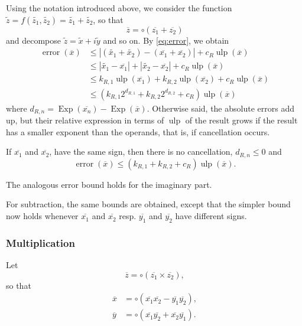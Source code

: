 \documentclass {article}
\newcommand {\corr}[1]{\widetilde {#1}}
\newcommand {\appro}[1]{\overline {#1}}
\newcommand {\Ulp}{{\operatorname {ulp}}}
\DeclareMathOperator{\Exp}{\operatorname {Exp}}
\newcommand{\error}{\operatorname {error}}
\renewcommand {\leq}{\leqslant}
\begin{document}
Using the notation introduced above, we consider the function
$\corr z = f (\corr {z_1}, \corr {z_2}) = \corr {z_1} + \corr {z_2}$, so that
\[
\appro z = \circ(\appro {z_1} + \appro {z_2})
\]
and decompose $\corr z = \corr x + i \corr y$ and so on.
By \eqref {eq:error}, we obtain
\begin{align*}
\error (\appro x)
& \leq | (\corr {x_1} + \corr {x_2}) - (\appro {x_1} + \appro {x_2})|
+ c_R \Ulp (\appro x)
\\
& \leq | \corr {x_1} - \appro {x_1} | + | \corr {x_2} - \appro {x_2}|
+ c_R \Ulp (\appro x)
\\
& \leq k_{R,1} \Ulp(\appro {x_1}) + k_{R,2} \Ulp(\appro {x_2})
+ c_R \Ulp (\appro x) \\
& \leq \left( k_{R,1} 2^{d_{R,1}} + k_{R,2} 2^{d_{R,2}} + c_R \right)
\Ulp (\appro x)
\end{align*}
where $d_{R,n}=\Exp(\appro {x_n})-\Exp(\appro x)$.
Otherwise said, the absolute errors add up, but their relative expression
in terms of $\Ulp$ of the result grows if the result has a smaller
exponent than the operands, that is, if cancellation occurs.

If $\appro {x_1}$ and $\appro {x_2}$, have the same sign, then there
is no cancellation, $d_{R, n} \leq 0$ and
\[
\error (\appro x) \leq (k_{R,1} + k_{R,2} + c_R) \Ulp(\appro x).
\]

The analogous error bound holds for the imaginary part.

For subtraction, the same bounds are obtained, except that the simpler bound
now holds whenever $\appro {x_1}$ and $\appro {x_2}$ resp.
$\appro {y_1}$ and $\appro {y_2}$ have different signs.


\subsubsection {Multiplication}

Let
\[
\appro z = \circ (\appro {z_1} \times \appro {z_2}),
\]
so that
\begin {align*}
\appro x & = \circ (\appro {x_1} \appro {x_2} - \appro {y_1} \appro {y_2}), \\
\appro y & = \circ (\appro {x_1} \appro {y_2} + \appro {x_2} \appro {y_1}).
\end {align*}
\end{document}
